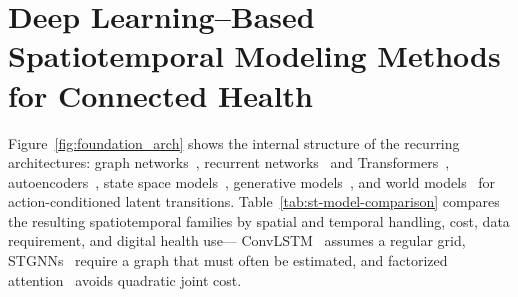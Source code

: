 \documentclass[journal]{IEEEtran}
\newif\ifsubmission
\begin{document}
\fi

\section{Deep Learning--Based Spatiotemporal Modeling Methods for Connected Health}
\label{sec:history}
\ifsubmission
Spatiotemporal deep learning in healthcare moved from feed-forward models with hand-engineered spatial context~\cite{miotto2018deeplearning} to graph convolution for non-Euclidean relations and attention for long-range dependence~\cite{caroprese2018deepehr}, and since 2020 to Transformers, self-supervised learning and multimodal fusion~\cite{sun2026irregularmedical}. In parallel the statistics literature supplied interpretable covariance structure and principled baselines for irregular, nonstationary locations~\cite{liu2022convectionDiffusion,wikle2023statisticalDeepLearning}.

Several of these architectures were first demonstrated on traffic or climate monitoring rather than on patients. We retain those exemplars because the task has the same shape as connected health sensing---distributed sensors at irregular rates over a non-Euclidean topology, bursty missingness when devices fail, and inference under bandwidth and energy limits---but the analogy stops where health adds subject-level identifiability, missingness informative of behavior, far smaller cohorts, and consequences for individuals.

\ifsubmission The families this survey draws on are\else Figure~\ref{fig:foundation_arch} shows the internal structure of the recurring architectures:\fi{} graph networks~\cite{scarselli2009gnn}, recurrent networks~\cite{rumelhart1986rnn} and Transformers~\cite{vaswani2017attention}, autoencoders~\cite{hinton2006reducing}, state space models~\cite{gu2023mamba}, generative models~\cite{goodfellow2014gan,ho2020ddpm}, and world models~\cite{maes2026leworldmodel} for action-conditioned latent transitions. \ifsubmission What matters for a connected deployment is the assumption each one imports, and Figure~\ref{fig:taxonomy} places them at the layers that can host them:\else Table~\ref{tab:st-model-comparison} compares the resulting spatiotemporal families by spatial and temporal handling, cost, data requirement, and digital health use---\fi{} ConvLSTM~\cite{shi2015convolutional} assumes a regular grid, STGNNs~\cite{shao2022longterm} require a graph that must often be estimated, and factorized attention~\cite{xu2020stransformer} avoids quadratic joint cost.
\end{document}
